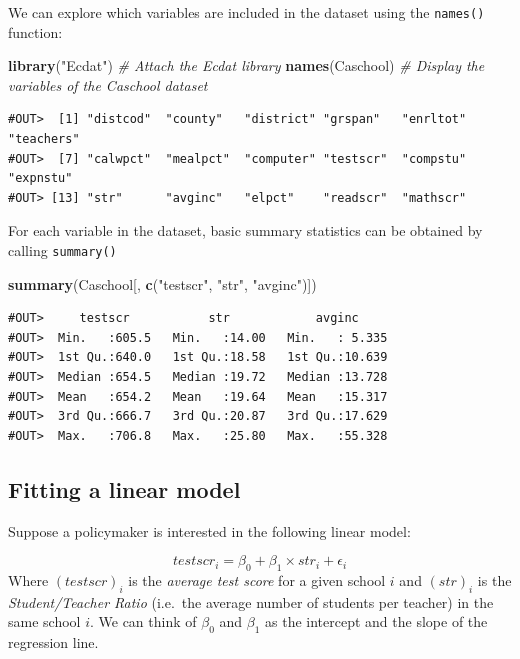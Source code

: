 \documentclass[]{book}
\newenvironment{Shaded}{\begin{snugshade}}{\end{snugshade}}
\newcommand{\KeywordTok}[1]{\textcolor[rgb]{0.13,0.29,0.53}{\textbf{#1}}}
\newcommand{\StringTok}[1]{\textcolor[rgb]{0.31,0.60,0.02}{#1}}
\newcommand{\CommentTok}[1]{\textcolor[rgb]{0.56,0.35,0.01}{\textit{#1}}}
\newcommand{\NormalTok}[1]{#1}
\theoremstyle{definition}
\theoremstyle{definition}
\theoremstyle{definition}
\theoremstyle{remark}
\begin{document}
We can explore which variables are included in the dataset using the
\texttt{names()} function:

\begin{Shaded}
\begin{Highlighting}[]
\KeywordTok{library}\NormalTok{(}\StringTok{"Ecdat"}\NormalTok{) }\CommentTok{# Attach the Ecdat library}
\KeywordTok{names}\NormalTok{(Caschool) }\CommentTok{# Display the variables of the Caschool dataset}
\end{Highlighting}
\end{Shaded}

\begin{verbatim}
#OUT>  [1] "distcod"  "county"   "district" "grspan"   "enrltot"  "teachers"
#OUT>  [7] "calwpct"  "mealpct"  "computer" "testscr"  "compstu"  "expnstu" 
#OUT> [13] "str"      "avginc"   "elpct"    "readscr"  "mathscr"
\end{verbatim}

For each variable in the dataset, basic summary statistics can be
obtained by calling \texttt{summary()}

\begin{Shaded}
\begin{Highlighting}[]
\KeywordTok{summary}\NormalTok{(Caschool[, }\KeywordTok{c}\NormalTok{(}\StringTok{"testscr"}\NormalTok{, }\StringTok{"str"}\NormalTok{, }\StringTok{"avginc"}\NormalTok{)])}
\end{Highlighting}
\end{Shaded}

\begin{verbatim}
#OUT>     testscr           str            avginc      
#OUT>  Min.   :605.5   Min.   :14.00   Min.   : 5.335  
#OUT>  1st Qu.:640.0   1st Qu.:18.58   1st Qu.:10.639  
#OUT>  Median :654.5   Median :19.72   Median :13.728  
#OUT>  Mean   :654.2   Mean   :19.64   Mean   :15.317  
#OUT>  3rd Qu.:666.7   3rd Qu.:20.87   3rd Qu.:17.629  
#OUT>  Max.   :706.8   Max.   :25.80   Max.   :55.328
\end{verbatim}

\subsection{Fitting a linear model}\label{fitting-a-linear-model}

Suppose a policymaker is interested in the following linear model:

\[testscr_i = \beta_0 + \beta_1 \times str_i + \epsilon_i\] Where
\((testscr)_i\) is the \emph{average test score} for a given school
\(i\) and \((str)_i\) is the \emph{Student/Teacher Ratio} (i.e.~the
average number of students per teacher) in the same school \(i\). We can
think of \(\beta_0\) and \(\beta_1\) as the intercept and the slope of
the regression line.
\end{document}
